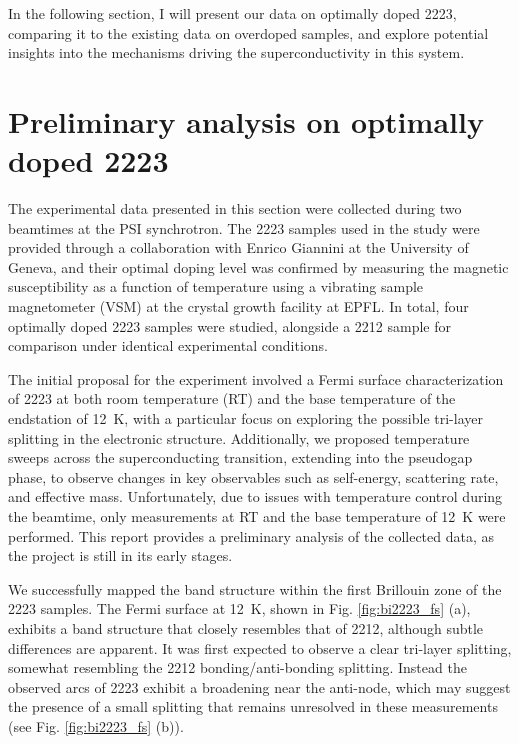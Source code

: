 In the following section, I will present our data on optimally doped 2223, comparing it to the existing data on overdoped samples, and explore potential insights into the mechanisms driving the superconductivity in this system.

\section{Preliminary analysis on optimally doped 2223}

The experimental data presented in this section were collected during two beamtimes at the PSI synchrotron.
The 2223 samples used in the study were provided through a collaboration with Enrico Giannini at the University of Geneva, and their optimal doping level was confirmed by measuring the magnetic susceptibility as a function of temperature using a vibrating sample magnetometer (VSM) at the crystal growth facility at EPFL.
In total, four optimally doped 2223 samples were studied, alongside a 2212 sample for comparison under identical experimental conditions.

The initial proposal for the experiment involved a Fermi surface characterization of 2223 at both room temperature (RT) and the base temperature of the endstation of \qty{12}{\kelvin}, with a particular focus on exploring the possible tri-layer splitting in the electronic structure.
Additionally, we proposed temperature sweeps across the superconducting transition, extending into the pseudogap phase, to observe changes in key observables such as self-energy, scattering rate, and effective mass.
Unfortunately, due to issues with temperature control during the beamtime, only measurements at RT and the base temperature of \qty{12}{\kelvin} were performed.
This report provides a preliminary analysis of the collected data, as the project is still in its early stages.

We successfully mapped the band structure within the first Brillouin zone of the 2223 samples.
The Fermi surface at \qty{12}{\kelvin}, shown in Fig. \ref{fig:bi2223_fs} (a), exhibits a band structure that closely resembles that of 2212, although subtle differences are apparent.
It was first expected to observe a clear tri-layer splitting, somewhat resembling the 2212 bonding/anti-bonding splitting.
Instead the observed arcs of 2223 exhibit a broadening near the anti-node, which may suggest the presence of a small splitting that remains unresolved in these measurements (see Fig. \ref{fig:bi2223_fs} (b)).


